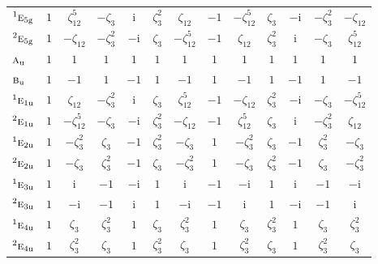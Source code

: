 \documentclass[10pt,a4paper]{article}
\numberwithin{equation}{section}
\newcommand{\irr}[1]{\text{\normalfont\scshape #1}}
\newcommand{\conjpair}[1]{{}^{#1}}
\newcommand{\ptag}[1]{\mathrm{#1}}
\newcommand{\iunit}{\mathrm{i}}
\newcommand{\rootunity}[1]{\zeta_{#1}}
\begin{document}
{\begin{longtable}{@{}lcccccccccccc@{}}
$\conjpair{1}\irr{e}_{5\ptag{g}}$ & $1$ & $\rootunity{12}^{5}$ & $-\rootunity{3}$ & $\iunit{}$ & $\rootunity{3}^{2}$ & $\rootunity{12}$ & $-1$ & $-\rootunity{12}^{5}$ & $\rootunity{3}$ & $-\iunit{}$ & $-\rootunity{3}^{2}$ & $-\rootunity{12}$\\
$\conjpair{2}\irr{e}_{5\ptag{g}}$ & $1$ & $-\rootunity{12}$ & $-\rootunity{3}^{2}$ & $-\iunit{}$ & $\rootunity{3}$ & $-\rootunity{12}^{5}$ & $-1$ & $\rootunity{12}$ & $\rootunity{3}^{2}$ & $\iunit{}$ & $-\rootunity{3}$ & $\rootunity{12}^{5}$\\
$\irr{a}_{\ptag{u}}$ & $1$ & $1$ & $1$ & $1$ & $1$ & $1$ & $1$ & $1$ & $1$ & $1$ & $1$ & $1$\\
$\irr{b}_{\ptag{u}}$ & $1$ & $-1$ & $1$ & $-1$ & $1$ & $-1$ & $1$ & $-1$ & $1$ & $-1$ & $1$ & $-1$\\
$\conjpair{1}\irr{e}_{1\ptag{u}}$ & $1$ & $\rootunity{12}$ & $-\rootunity{3}^{2}$ & $\iunit{}$ & $\rootunity{3}$ & $\rootunity{12}^{5}$ & $-1$ & $-\rootunity{12}$ & $\rootunity{3}^{2}$ & $-\iunit{}$ & $-\rootunity{3}$ & $-\rootunity{12}^{5}$\\
$\conjpair{2}\irr{e}_{1\ptag{u}}$ & $1$ & $-\rootunity{12}^{5}$ & $-\rootunity{3}$ & $-\iunit{}$ & $\rootunity{3}^{2}$ & $-\rootunity{12}$ & $-1$ & $\rootunity{12}^{5}$ & $\rootunity{3}$ & $\iunit{}$ & $-\rootunity{3}^{2}$ & $\rootunity{12}$\\
$\conjpair{1}\irr{e}_{2\ptag{u}}$ & $1$ & $-\rootunity{3}^{2}$ & $\rootunity{3}$ & $-1$ & $\rootunity{3}^{2}$ & $-\rootunity{3}$ & $1$ & $-\rootunity{3}^{2}$ & $\rootunity{3}$ & $-1$ & $\rootunity{3}^{2}$ & $-\rootunity{3}$\\
$\conjpair{2}\irr{e}_{2\ptag{u}}$ & $1$ & $-\rootunity{3}$ & $\rootunity{3}^{2}$ & $-1$ & $\rootunity{3}$ & $-\rootunity{3}^{2}$ & $1$ & $-\rootunity{3}$ & $\rootunity{3}^{2}$ & $-1$ & $\rootunity{3}$ & $-\rootunity{3}^{2}$\\
$\conjpair{1}\irr{e}_{3\ptag{u}}$ & $1$ & $\iunit{}$ & $-1$ & $-\iunit{}$ & $1$ & $\iunit{}$ & $-1$ & $-\iunit{}$ & $1$ & $\iunit{}$ & $-1$ & $-\iunit{}$\\
$\conjpair{2}\irr{e}_{3\ptag{u}}$ & $1$ & $-\iunit{}$ & $-1$ & $\iunit{}$ & $1$ & $-\iunit{}$ & $-1$ & $\iunit{}$ & $1$ & $-\iunit{}$ & $-1$ & $\iunit{}$\\
$\conjpair{1}\irr{e}_{4\ptag{u}}$ & $1$ & $\rootunity{3}$ & $\rootunity{3}^{2}$ & $1$ & $\rootunity{3}$ & $\rootunity{3}^{2}$ & $1$ & $\rootunity{3}$ & $\rootunity{3}^{2}$ & $1$ & $\rootunity{3}$ & $\rootunity{3}^{2}$\\
$\conjpair{2}\irr{e}_{4\ptag{u}}$ & $1$ & $\rootunity{3}^{2}$ & $\rootunity{3}$ & $1$ & $\rootunity{3}^{2}$ & $\rootunity{3}$ & $1$ & $\rootunity{3}^{2}$ & $\rootunity{3}$ & $1$ & $\rootunity{3}^{2}$ & $\rootunity{3}$\\

\end{longtable}}
\end{document}
